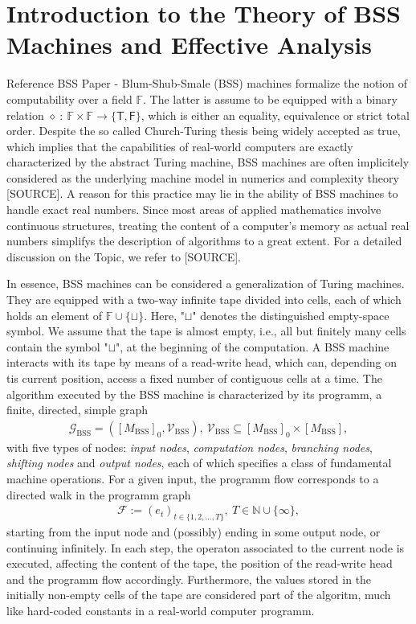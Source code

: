 \documentclass[conference]{IEEEtran}
\def\G{{\mathcal G}}
\def\V{{\mathcal V}}
\def\F{{\mathcal F}}
\def\NN{{\mathbb N}}
\def\FF{{\mathbb F}}
\newcommand{\BSS}{\mathrm{BSS}}
\newcommand{\sdummy}{{\color{red}[SOURCE]}}
\begin{document}
\section{Introduction to the Theory of BSS Machines and Effective Analysis}
	{\color{red} Reference BSS Paper - }
	Blum-Shub-Smale (BSS) machines formalize the notion of computability over a field \(\FF\). The latter is assume to be equipped 
	with a binary relation \(\diamond~{:}~\FF \times \FF \rightarrow \{\mathsf{T},\mathsf{F}\}\), which is either an equality, equivalence or strict total order. 
	Despite the so called Church-Turing thesis being widely accepted as true, which implies that the capabilities of real-world computers are exactly characterized 
	by the abstract Turing machine, BSS machines are often implicitely considered as the underlying machine model in numerics and complexity theory \sdummy. 
	A reason for this practice may lie in the ability of BSS machines to handle exact real numbers. Since most areas of applied mathematics involve continuous structures, 
	treating the content of a computer's memory as actual real numbers simplifys the description of algorithms to a great extent. For a detailed discussion on the Topic, we refer to \sdummy.

	In essence, BSS machines can be considered a generalization of Turing machines. They are equipped with a two-way infinite tape divided into cells, each of which holds an 
	element of \(\FF\cup\{\sqcup\}\). Here, "\(\sqcup\)" denotes the distinguished empty-space symbol. We assume that the tape is almost empty, i.e., all but finitely many cells 
	contain the symbol "\(\sqcup\)", at the beginning of the computation. A BSS machine interacts with its tape by means of a read-write head, which can, depending on tis current 
	position, access a fixed number of contiguous cells at a time. The algorithm executed by the BSS machine is characterized by its programm, a finite, directed, simple graph 
	\begin{align}   \G_\BSS = ([M_\BSS]_{0}, \V_\BSS),~ \V_\BSS \subseteq [M_\BSS]_{0} \times [M_\BSS],
	\end{align} 
	with five types of nodes: \emph{input nodes}, \emph{computation nodes}, \emph{branching nodes}, \emph{shifting nodes} and \emph{output nodes}, each of which specifies a class 
	of fundamental machine operations. For a given input, the programm flow corresponds to a directed walk in the programm graph
	\begin{align}	\F := (e_t)_{t\in\{1,2,\ldots,T\}},~T\in\NN\cup \{\infty\},
	\end{align}
	starting from the input node and (possibly) ending in some output node, or continuing infinitely. In each step, the operaton associated to the current node is executed, 
	affecting the content of the tape, the position of the read-write head and the programm flow accordingly. Furthermore, the values stored in the initially non-empty cells 
	of the tape are considered part of the algoritm, much like hard-coded constants in a real-world computer programm. 
\end{document}

